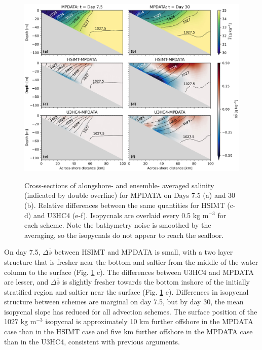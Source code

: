 \begin{figure}[t!]
    \begin{center}
    \includegraphics[width = \linewidth]{figures/shelfstrat_2024/tadv_cs_salt_isopyc.jpg}\\
    \caption{Cross-sections of alongshore- and ensemble- averaged salinity (indicated by double overline) for MPDATA on Days 7.5 (a) and 30 (b). Relative differences between the same quantities for HSIMT (c-d) and U3HC4 (e-f). Isopycnals are overlaid every 0.5 kg m$^{-3}$ for each scheme. Note the bathymetry noise is smoothed by the averaging, so the isopycnals do not appear to reach the seafloor.} \label{fig:cs_salt}
     \end{center} 
\end{figure}

On day 7.5, $\Delta \overline{\overline{s}}$ between HSIMT and MPDATA is small, with a two layer structure that is fresher near the bottom and saltier from the middle of the water column to the surface (Fig. \ref{fig:cs_salt} c).  The differences between U3HC4 and MPDATA are lesser, and $\Delta \overline{\overline{s}}$ is slightly fresher towards the bottom inshore of the initially stratified region and saltier near the surface (Fig. \ref{fig:cs_salt} e). Differences in isopycnal structure between schemes are marginal on day 7.5, but by day 30, the mean isopycnal slope has reduced for all advection schemes. The surface position of the 1027 kg m$^{-3}$ isopycnal is approximately 10 km further offshore in the MPDATA case than in the HSIMT case and five km further offshore in the  MPDATA case than in the U3HC4, consistent with previous arguments. 

